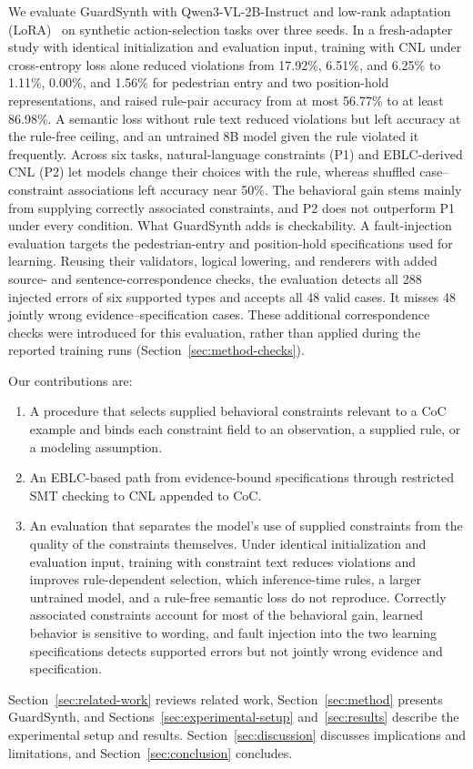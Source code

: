 We evaluate GuardSynth with Qwen3-VL-2B-Instruct and low-rank adaptation (LoRA)~\cite{r14} on synthetic action-selection tasks over three seeds. In a fresh-adapter study with identical initialization and evaluation input, training with CNL under cross-entropy loss alone reduced violations from 17.92\%, 6.51\%, and 6.25\% to 1.11\%, 0.00\%, and 1.56\% for pedestrian entry and two position-hold representations, and raised rule-pair accuracy from at most 56.77\% to at least 86.98\%. A semantic loss without rule text reduced violations but left accuracy at the rule-free ceiling, and an untrained 8B model given the rule violated it frequently. Across six tasks, natural-language constraints (P1) and EBLC-derived CNL (P2) let models change their choices with the rule, whereas shuffled case--constraint associations left accuracy near 50\%. The behavioral gain stems mainly from supplying correctly associated constraints, and P2 does not outperform P1 under every condition. What GuardSynth adds is checkability. A fault-injection evaluation targets the pedestrian-entry and position-hold specifications used for learning. Reusing their validators, logical lowering, and renderers with added source- and sentence-correspondence checks, the evaluation detects all 288 injected errors of six supported types and accepts all 48 valid cases. It misses 48 jointly wrong evidence--specification cases. These additional correspondence checks were introduced for this evaluation, rather than applied during the reported training runs (Section~\ref{sec:method-checks}).\par

Our contributions are:\par

\begin{enumerate}
\item A procedure that selects supplied behavioral constraints relevant to a CoC example and binds each constraint field to an observation, a supplied rule, or a modeling assumption.
\item An EBLC-based path from evidence-bound specifications through restricted SMT checking to CNL appended to CoC.
\item An evaluation that separates the model's use of supplied constraints from the quality of the constraints themselves. Under identical initialization and evaluation input, training with constraint text reduces violations and improves rule-dependent selection, which inference-time rules, a larger untrained model, and a rule-free semantic loss do not reproduce. Correctly associated constraints account for most of the behavioral gain, learned behavior is sensitive to wording, and fault injection into the two learning specifications detects supported errors but not jointly wrong evidence and specification.
\end{enumerate}

Section~\ref{sec:related-work} reviews related work, Section~\ref{sec:method} presents GuardSynth, and Sections~\ref{sec:experimental-setup} and~\ref{sec:results} describe the experimental setup and results. Section~\ref{sec:discussion} discusses implications and limitations, and Section~\ref{sec:conclusion} concludes.\par
